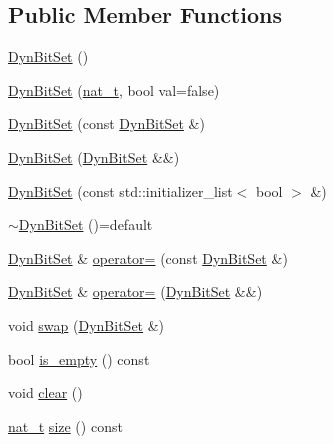 \subsection*{Public Member Functions}
\begin{DoxyCompactItemize}
\item 
\hyperlink{class_designar_1_1_dyn_bit_set_a41e552380bd305a4069900b1e6b655e8}{Dyn\+Bit\+Set} ()
\item 
\hyperlink{class_designar_1_1_dyn_bit_set_a212b47cbc4cc6c3424d0906924790734}{Dyn\+Bit\+Set} (\hyperlink{namespace_designar_aa72662848b9f4815e7bf31a7cf3e33d1}{nat\+\_\+t}, bool val=false)
\item 
\hyperlink{class_designar_1_1_dyn_bit_set_a43501b702a17c0ab0aa2316861a1e536}{Dyn\+Bit\+Set} (const \hyperlink{class_designar_1_1_dyn_bit_set}{Dyn\+Bit\+Set} \&)
\item 
\hyperlink{class_designar_1_1_dyn_bit_set_ad974f6f490c9e97d8c149c1d8d9be6c8}{Dyn\+Bit\+Set} (\hyperlink{class_designar_1_1_dyn_bit_set}{Dyn\+Bit\+Set} \&\&)
\item 
\hyperlink{class_designar_1_1_dyn_bit_set_a4e1f211af29be8c968e23666b5e8641e}{Dyn\+Bit\+Set} (const std\+::initializer\+\_\+list$<$ bool $>$ \&)
\item 
\hyperlink{class_designar_1_1_dyn_bit_set_a5215370dcc0022588d2d8c9484d65c7a}{$\sim$\+Dyn\+Bit\+Set} ()=default
\item 
\hyperlink{class_designar_1_1_dyn_bit_set}{Dyn\+Bit\+Set} \& \hyperlink{class_designar_1_1_dyn_bit_set_a851472c8fbea77e9be47b39584df227d}{operator=} (const \hyperlink{class_designar_1_1_dyn_bit_set}{Dyn\+Bit\+Set} \&)
\item 
\hyperlink{class_designar_1_1_dyn_bit_set}{Dyn\+Bit\+Set} \& \hyperlink{class_designar_1_1_dyn_bit_set_a1302731fc0c006fca16137697529dc39}{operator=} (\hyperlink{class_designar_1_1_dyn_bit_set}{Dyn\+Bit\+Set} \&\&)
\item 
void \hyperlink{class_designar_1_1_dyn_bit_set_a376fe3b34a2a0c93bde8f33ff2947e64}{swap} (\hyperlink{class_designar_1_1_dyn_bit_set}{Dyn\+Bit\+Set} \&)
\item 
bool \hyperlink{class_designar_1_1_dyn_bit_set_a07337c0749b7b75ffbd6e9ff56348963}{is\+\_\+empty} () const
\item 
void \hyperlink{class_designar_1_1_dyn_bit_set_af73666f08fda747f5d2dd9c1343f884f}{clear} ()
\item 
\hyperlink{namespace_designar_aa72662848b9f4815e7bf31a7cf3e33d1}{nat\+\_\+t} \hyperlink{class_designar_1_1_dyn_bit_set_a0107a8946533f6b8dc9a225a2f5b91a9}{size} () const

\end{DoxyCompactItemize}
